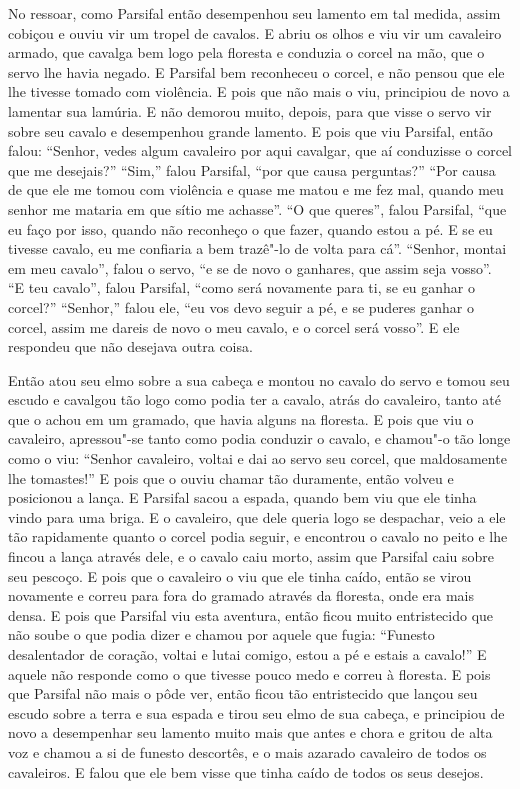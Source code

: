 No ressoar, como Parsifal então desempenhou seu lamento em tal medida,
assim cobiçou e ouviu vir um tropel de cavalos. E abriu os olhos e viu vir um
cavaleiro armado, que cavalga bem logo pela floresta e conduzia o corcel na
mão, que o servo lhe havia negado. E Parsifal bem reconheceu o corcel, e não
pensou que ele lhe tivesse tomado com violência. E pois que não mais o viu,
principiou de novo a lamentar sua lamúria. E não demorou muito, depois, para
que visse o servo vir sobre seu cavalo e desempenhou grande lamento. E pois que
viu Parsifal, então falou: “Senhor, vedes algum cavaleiro por aqui cavalgar,
que aí conduzisse o corcel que me desejais?” “Sim,” falou Parsifal, “por que
causa perguntas?” “Por causa de que ele me tomou com violência e quase me matou
e me fez mal, quando meu senhor me mataria em que sítio me achasse”. “O que
queres”, falou Parsifal, “que eu faço por isso, quando não reconheço o que
fazer, quando estou a pé. E se eu tivesse cavalo, eu me confiaria a bem
trazê"-lo de volta para cá”. “Senhor, montai em meu cavalo”, falou o servo, “e
se de novo o ganhares, que assim seja vosso”. “E teu cavalo”, falou Parsifal,
“como será novamente para ti, se eu ganhar o corcel?” “Senhor,” falou ele, “eu
vos devo seguir a pé, e se puderes ganhar o corcel, assim me dareis de novo o
meu cavalo, e o corcel será vosso”. E ele respondeu que não desejava outra
coisa. 

Então atou seu elmo sobre a sua cabeça e montou no cavalo do servo e tomou
seu escudo e cavalgou tão logo como podia ter a cavalo, atrás do cavaleiro,
tanto até que o achou em um gramado, que havia alguns na floresta. E pois que
viu o cavaleiro, apressou"-se tanto como podia conduzir o cavalo, e chamou"-o tão
longe como o viu: “Senhor cavaleiro, voltai e dai ao servo seu corcel, que
maldosamente lhe tomastes!” E pois que o ouviu chamar tão
duramente, então volveu e posicionou a lança. E Parsifal sacou a espada,
quando bem viu que ele tinha vindo para uma briga. E o cavaleiro, que dele
queria logo se despachar, veio a ele tão rapidamente quanto o corcel podia
seguir, e encontrou o cavalo no peito e lhe fincou a lança através dele, e o
cavalo caiu morto, assim que Parsifal caiu sobre seu pescoço. E pois que o
cavaleiro o viu que ele tinha caído, então se virou novamente e correu para
fora do gramado através da floresta, onde era mais densa. E pois que Parsifal
viu esta aventura, então ficou muito entristecido que não soube o que podia
dizer e chamou por aquele que fugia: “Funesto desalentador de coração, voltai e
lutai comigo, estou a pé e estais a cavalo!” E aquele não responde como o que
tivesse pouco medo e correu à floresta. E pois que Parsifal não mais o pôde
ver, então ficou tão entristecido que lançou seu escudo sobre a terra e sua
espada e tirou seu elmo de sua cabeça, e principiou de novo a desempenhar seu
lamento muito mais que antes e chora e gritou de alta voz e chamou a si de
funesto descortês, e o mais azarado cavaleiro de todos os cavaleiros.
E falou que ele bem visse que tinha caído de todos os seus desejos.

